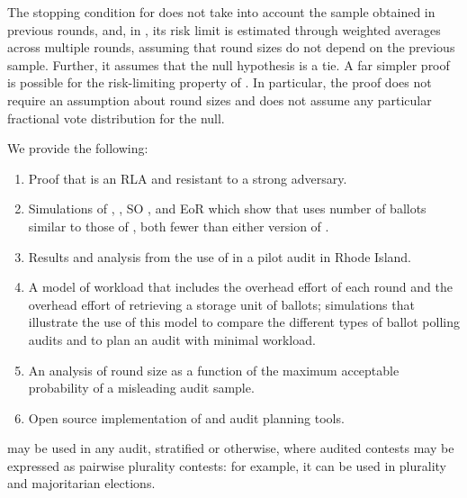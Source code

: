 The stopping condition for \Minerva does not take into account the sample obtained in previous rounds, and, in \cite{usenix_minerva}, its risk limit is estimated through weighted averages across multiple rounds, assuming that round sizes do not depend on the previous sample. Further, it assumes that the null hypothesis is a tie. A far simpler proof is possible for the risk-limiting property of \Providence. In particular, the proof does not require an assumption about round sizes and does not assume any particular fractional vote distribution for the null. 

We provide the following:
\begin{enumerate}
\item Proof that \Providence is an RLA and resistant to a strong adversary.
\item Simulations of \Providence, \Minerva, SO \BRAVO, and EoR \BRAVO which show that \Providence uses number of ballots similar to those of \Minerva, both fewer than either version of \BRAVO.
\item Results and analysis from the use of \Providence in a pilot audit in Rhode Island.
\item A model of workload that includes the overhead effort of each round and the overhead effort of retrieving a storage unit of ballots; simulations that illustrate the use of this model to compare the different types of ballot polling audits and to plan an audit with minimal workload.
\item An analysis of round size as a function of the maximum acceptable probability of a misleading audit sample.
\item Open source implementation of \Providence and audit planning tools. 
\end{enumerate}

\Providence may be used in any audit, stratified or otherwise, where audited contests may be expressed as pairwise plurality contests: for example, it can be used in plurality and majoritarian elections. 


